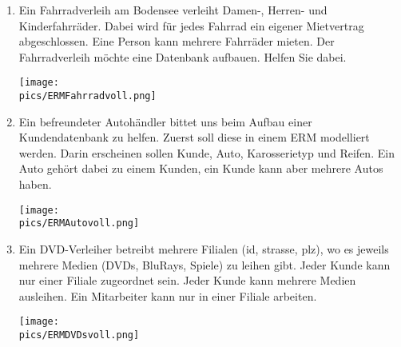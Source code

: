 \begin{Answer}[ref=ERMErstellen2]
	\begin{enumerate}
		\item Ein Fahrradverleih am Bodensee verleiht Damen-, Herren- und Kinderfahrräder. Dabei wird für jedes Fahrrad ein eigener Mietvertrag abgeschlossen. Eine Person kann mehrere Fahrräder mieten. Der Fahrradverleih möchte eine Datenbank aufbauen. Helfen Sie dabei.\\
		\begin{minipage}{0.8\textwidth}
			\centering\texttt{[image: \\pics/ERMFahrradvoll.png]}\\
		\end{minipage}
		\item Ein befreundeter Autohändler bittet uns beim Aufbau einer Kundendatenbank zu helfen. Zuerst soll diese in einem ERM modelliert werden. Darin erscheinen sollen Kunde, Auto, Karosserietyp und Reifen. Ein Auto gehört dabei zu einem Kunden, ein Kunde kann aber mehrere Autos haben.\\
		\begin{minipage}{0.8\textwidth}
			\centering\texttt{[image: \\pics/ERMAutovoll.png]}\\
		\end{minipage}
		\item Ein DVD-Verleiher betreibt mehrere Filialen (id, strasse, plz), wo es jeweils mehrere Medien (DVDs, BluRays, Spiele) zu leihen gibt. Jeder Kunde kann nur einer Filiale zugeordnet sein. Jeder Kunde kann mehrere Medien ausleihen. Ein Mitarbeiter kann nur in einer Filiale arbeiten.\\
		\begin{minipage}{0.8\textwidth}
			\centering\texttt{[image: \\pics/ERMDVDsvoll.png]}\\
		\end{minipage}
	\end{enumerate}
\end{Answer}

